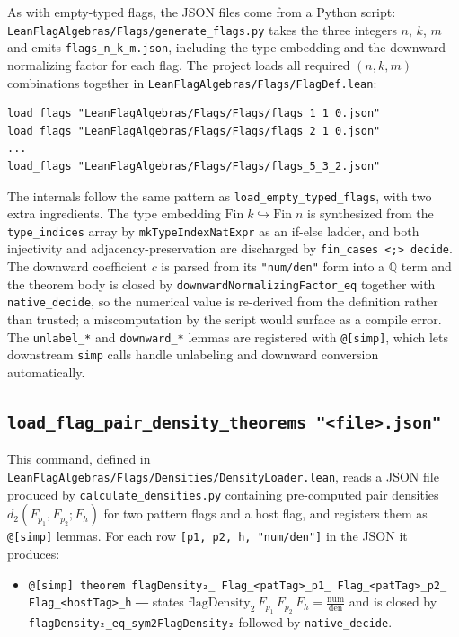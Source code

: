\documentclass[11pt]{article}
\begin{document}
As with empty-typed flags, the JSON files come from a Python script:
\texttt{LeanFlagAlgebras/Flags/generate\_flags.py} takes the three
integers $n$, $k$, $m$ and emits \texttt{flags\_n\_k\_m.json},
including the type embedding and the downward normalizing factor for
each flag. The project loads all required $(n,k,m)$ combinations
together in \texttt{LeanFlagAlgebras/Flags/FlagDef.lean}:

\begin{lstlisting}
load_flags "LeanFlagAlgebras/Flags/Flags/flags_1_1_0.json"
load_flags "LeanFlagAlgebras/Flags/Flags/flags_2_1_0.json"
...
load_flags "LeanFlagAlgebras/Flags/Flags/flags_5_3_2.json"
\end{lstlisting}

The internals follow the same pattern as
\texttt{load\_empty\_typed\_flags}, with two extra ingredients. The
type embedding $\mathrm{Fin}\;k \hookrightarrow \mathrm{Fin}\;n$ is
synthesized from the \texttt{type\_indices} array by
\texttt{mkTypeIndexNatExpr} as an if-else ladder, and both injectivity
and adjacency-preservation are discharged by
\texttt{fin\_cases <;> decide}. The downward coefficient $c$ is parsed
from its \texttt{"num/den"} form into a $\mathbb{Q}$ term and the
theorem body is closed by
\texttt{downwardNormalizingFactor\_eq} together with
\texttt{native\_decide}, so the numerical value is re-derived from the
definition rather than trusted; a miscomputation by the script would
surface as a compile error. The \texttt{unlabel\_*} and
\texttt{downward\_*} lemmas are registered with \texttt{@[simp]},
which lets downstream \texttt{simp} calls handle unlabeling and
downward conversion automatically.

\subsection{\texttt{load\_flag\_pair\_density\_theorems "<file>.json"}}

This command, defined in
\texttt{LeanFlagAlgebras/Flags/Densities/DensityLoader.lean}, reads a
JSON file produced by \texttt{calculate\_densities.py} containing
pre-computed pair densities $d_2(F_{p_1}, F_{p_2}; F_h)$ for two
pattern flags and a host flag, and registers them as \texttt{@[simp]}
lemmas. For each row \texttt{[p1, p2, h, "num/den"]} in the JSON it
produces:

\begin{itemize}
  \item \texttt{@[simp] theorem flagDensity₂\_\allowbreak
    Flag\_<patTag>\_p1\_\allowbreak
    Flag\_<patTag>\_p2\_\allowbreak
    Flag\_<hostTag>\_h} ― states
    $\mathrm{flagDensity}_2\,F_{p_1}\,F_{p_2}\,F_h
       = \tfrac{\mathrm{num}}{\mathrm{den}}$
    and is closed by
    \texttt{flagDensity₂\_eq\_sym2FlagDensity₂} followed by
    \texttt{native\_decide}.
\end{itemize}
\end{document}
